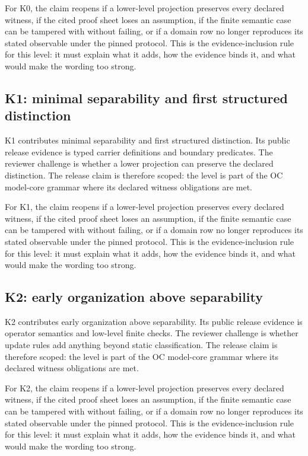 For K0, the claim reopens if a lower-level projection preserves every declared witness, if the cited proof sheet loses an assumption, if the finite semantic case can be tampered with without failing, or if a domain row no longer reproduces its stated observable under the pinned protocol. This is the evidence-inclusion rule for this level: it must explain what it adds, how the evidence binds it, and what would make the wording too strong.


\subsection{K1: minimal separability and first structured distinction}

K1 contributes minimal separability and first structured distinction. Its public release evidence is typed carrier definitions and boundary predicates. The reviewer challenge is whether a lower projection can preserve the declared distinction. The release claim is therefore scoped: the level is part of the OC model-core grammar where its declared witness obligations are met.


For K1, the claim reopens if a lower-level projection preserves every declared witness, if the cited proof sheet loses an assumption, if the finite semantic case can be tampered with without failing, or if a domain row no longer reproduces its stated observable under the pinned protocol. This is the evidence-inclusion rule for this level: it must explain what it adds, how the evidence binds it, and what would make the wording too strong.


\subsection{K2: early organization above separability}

K2 contributes early organization above separability. Its public release evidence is operator semantics and low-level finite checks. The reviewer challenge is whether update rules add anything beyond static classification. The release claim is therefore scoped: the level is part of the OC model-core grammar where its declared witness obligations are met.


For K2, the claim reopens if a lower-level projection preserves every declared witness, if the cited proof sheet loses an assumption, if the finite semantic case can be tampered with without failing, or if a domain row no longer reproduces its stated observable under the pinned protocol. This is the evidence-inclusion rule for this level: it must explain what it adds, how the evidence binds it, and what would make the wording too strong.


